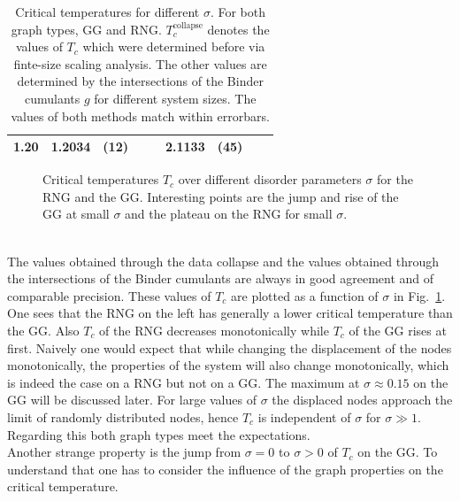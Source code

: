 \begin{table}[htb]
\begin{tabular}{l l@{}l l@{}l l@{}l l@{}l}
            1.20 & 1.2034&(12)&       &    & 2.1133&(45) &       &    \\
            \bottomrule
        \end{tabular}
        \caption[Critical Temperatures for Different $\sigma$]{
            Critical temperatures for different $\sigma$. For both graph
            types, GG and RNG. \(T_c^{\mathrm{collapse}}\) denotes the
            values of \(T_c\) which were determined before via finte-size
            scaling analysis. The other values are determined by
            the intersections of the Binder cumulants \(g\) for different
            system sizes. The values of both methods match within errorbars.
        }
        \label{tab:critTemp}
    \end{table}
    \begin{figure}[h!]
        \centering
        \caption[Critical Temperature over Different Disorder Parameters]
        {
            Critical temperatures \(T_c\) over different
            disorder parameters \(\sigma\) for
             the RNG and
             the GG.
            Interesting points are the jump and rise of the GG at small
            \(\sigma\) and the plateau on the RNG for small \(\sigma\).
        }
        \label{fig:Tc}
    \end{figure}\\
    The values obtained through the data collapse and the values obtained
    through the intersections of the Binder cumulants are always in good
    agreement and of comparable precision. These values of \(T_c\) are
    plotted as a function of \(\sigma\) in Fig.\ \ref{fig:Tc}.
    One sees that the RNG on the left has generally a lower critical
    temperature than the GG.
    Also \(T_c\) of the RNG decreases
    monotonically while \(T_c\) of the GG rises at first. Naively one would
    expect that while changing the displacement of the nodes monotonically,
    the properties of the system will also change monotonically, which is
    indeed the case on a RNG but not on a GG. The
    maximum at \(\sigma \approx 0.15\) on the GG will be discussed later.
    For large values of \(\sigma\) the displaced nodes approach the limit of randomly
    distributed nodes, hence \(T_c\) is independent of \(\sigma\) for
    \(\sigma \gg 1\). Regarding this both graph types meet the expectations.\\
    Another strange property is the jump from \(\sigma = 0\) to \(\sigma > 0\)
    of \(T_c\) on the GG. To understand that one has to
    consider the influence of the graph properties on the critical
    temperature.

